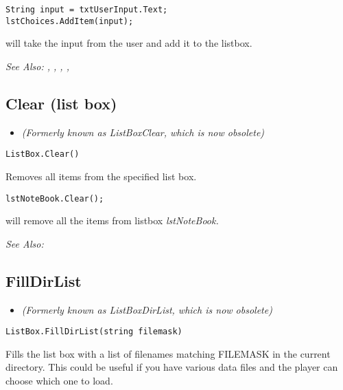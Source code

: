 \begin{verbatim}
String input = txtUserInput.Text;
lstChoices.AddItem(input);
\end{verbatim}
will take the input from the user and add it to the listbox.

\it{See Also:} ,
,
,
,


\subsection{Clear (list box)}\label{ListBox.Clear}%

\begin{itemize}
\item \it{(Formerly known as ListBoxClear, which is now obsolete)}
\end{itemize}

\begin{verbatim}
ListBox.Clear()
\end{verbatim}
Removes all items from the specified list box.

\begin{verbatim}
lstNoteBook.Clear();
\end{verbatim}
will remove all the items from listbox \it{lstNoteBook}.

\it{See Also:} 


\subsection{FillDirList}\label{ListBox.FillDirList}%

\begin{itemize}
\item \it{(Formerly known as ListBoxDirList, which is now obsolete)}
\end{itemize}

\begin{verbatim}
ListBox.FillDirList(string filemask)
\end{verbatim}
Fills the list box with a list of filenames matching FILEMASK in
the current directory. This could be useful if you have various
data files and the player can choose which one to load.

